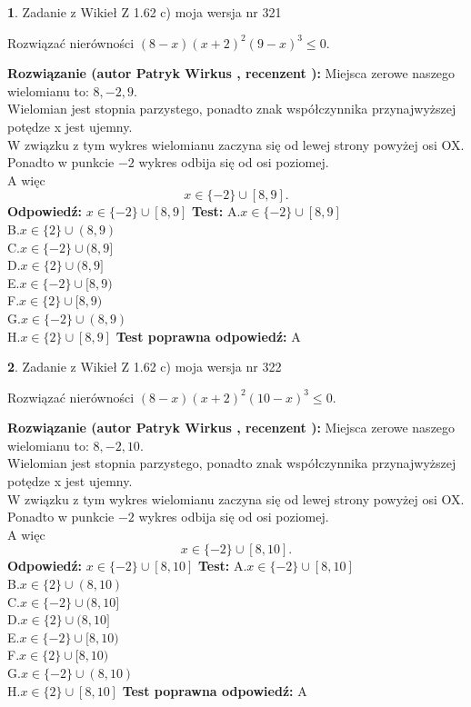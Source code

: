 \documentclass[12pt, a4paper]{article}
\theoremstyle{definition} %
\newtheorem{zad}{}
\newcommand{\zadStart}[1]{\begin{zad}#1\newline}
\newcommand{\zadStop}{\end{zad}}
\newcommand{\rozwStart}[2]{\noindent \textbf{Rozwiązanie (autor #1 , recenzent #2): }\newline}
\newcommand{\rozwStop}{\newline}
\newcommand{\odpStart}{\noindent \textbf{Odpowiedź:}\newline}
\newcommand{\odpStop}{\newline}
\newcommand{\testStart}{\noindent \textbf{Test:}\newline}
\newcommand{\testStop}{\newline}
\newcommand{\kluczStart}{\noindent \textbf{Test poprawna odpowiedź:}\newline}
\newcommand{\kluczStop}{\newline}
\begin{document}
\zadStart{Zadanie z Wikieł Z 1.62 c) moja wersja nr 321}

Rozwiązać nierówności $(8-x)(x+2)^{2}(9-x)^{3}\le0$.
\zadStop
\rozwStart{Patryk Wirkus}{}
Miejsca zerowe naszego wielomianu to: $8, -2, 9$.\\
Wielomian jest stopnia parzystego, ponadto znak współczynnika przy\linebreak najwyższej potędze x jest ujemny.\\ W związku z tym wykres wielomianu zaczyna się od lewej strony powyżej osi OX.\\
Ponadto w punkcie $-2$ wykres odbija się od osi poziomej.\\
A więc $$x \in \{-2\} \cup [8,9].$$
\rozwStop
\odpStart
$x \in \{-2\} \cup [8,9]$
\odpStop
\testStart
A.$x \in \{-2\} \cup [8,9]$\\
B.$x \in \{2\} \cup (8,9)$\\
C.$x \in \{-2\} \cup (8,9]$\\
D.$x \in \{2\} \cup (8,9]$\\
E.$x \in \{-2\} \cup [8,9)$\\
F.$x \in \{2\} \cup [8,9)$\\
G.$x \in \{-2\} \cup (8,9)$\\
H.$x \in \{2\} \cup [8,9]$
\testStop
\kluczStart
A
\kluczStop



\zadStart{Zadanie z Wikieł Z 1.62 c) moja wersja nr 322}

Rozwiązać nierówności $(8-x)(x+2)^{2}(10-x)^{3}\le0$.
\zadStop
\rozwStart{Patryk Wirkus}{}
Miejsca zerowe naszego wielomianu to: $8, -2, 10$.\\
Wielomian jest stopnia parzystego, ponadto znak współczynnika przy\linebreak najwyższej potędze x jest ujemny.\\ W związku z tym wykres wielomianu zaczyna się od lewej strony powyżej osi OX.\\
Ponadto w punkcie $-2$ wykres odbija się od osi poziomej.\\
A więc $$x \in \{-2\} \cup [8,10].$$
\rozwStop
\odpStart
$x \in \{-2\} \cup [8,10]$
\odpStop
\testStart
A.$x \in \{-2\} \cup [8,10]$\\
B.$x \in \{2\} \cup (8,10)$\\
C.$x \in \{-2\} \cup (8,10]$\\
D.$x \in \{2\} \cup (8,10]$\\
E.$x \in \{-2\} \cup [8,10)$\\
F.$x \in \{2\} \cup [8,10)$\\
G.$x \in \{-2\} \cup (8,10)$\\
H.$x \in \{2\} \cup [8,10]$
\testStop
\kluczStart
A
\kluczStop
\end{document}
